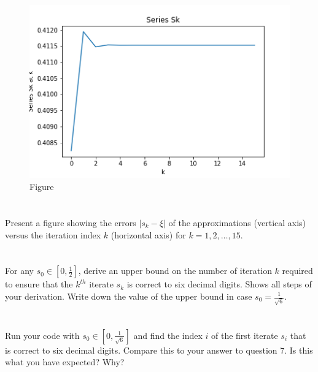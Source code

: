 \documentclass{article}
\begin{document}
\begin{figure}[H]
    \centering
    \includegraphics[width = .7\linewidth]{images/hw01q05.png}
    \caption{Figure}
    \label{fig:my_label}
\end{figure}


\section{}
Present a figure showing the errors $|s_k - \xi|$ of the approximations (vertical axis) versus the iteration index $k$ (horizontal axis) for $k=1,2,\dots,15$.
\vspace{10mm}



\section{}
For any $s_0 \in \left[0, \frac{1}{2} \right]$, derive an upper bound on the number of iteration $k$ required to ensure that the $k^{th}$ iterate $s_k$ is correct to six decimal digits. Shows all steps of your derivation. Write down the value of the upper bound in case $s_0 = \frac{1}{\sqrt{6}}$.
\vspace{10mm}

\section{}
Run your code with $s_0 \in \left[0,\frac{1}{\sqrt{6}} \right]$ and find the index $i$ of the first iterate $s_i$ that is correct to six decimal digits. Compare this to your answer to question 7. Is this what you have expected? Why?
\vspace{10mm}
\end{document}
